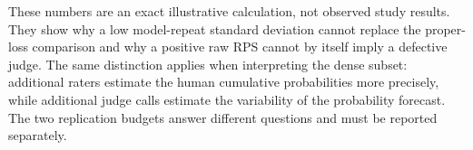 These numbers are an exact illustrative calculation, not observed study results.
They show why a low model-repeat standard deviation cannot replace the proper-loss comparison and why a positive raw RPS cannot by itself imply a defective judge.
The same distinction applies when interpreting the dense subset: additional raters estimate the human cumulative probabilities more precisely, while additional judge calls estimate the variability of the probability forecast.
The two replication budgets answer different questions and must be reported separately.
